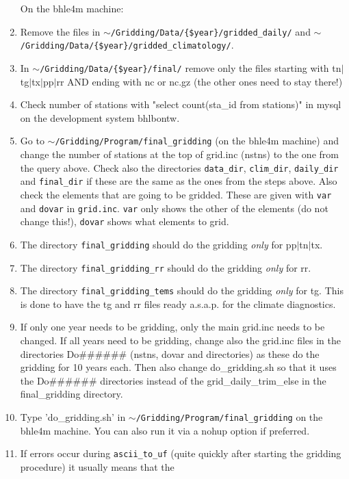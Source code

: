 \documentclass[a4paper]{article}
\begin{document}
\begin{enumerate}
\noindent On the bhle4m machine:
\item Remove the files in
\texttt{$\sim$/Gridding/Data/\{\$year\}/gridded\_daily/}
and \linebreak
\texttt{$\sim$/Gridding/Data/\{\$year\}/gridded\_climatology/}.
\item In \texttt{$\sim$/Gridding/Data/\{\$year\}/final/} remove only the
  files starting with tn$|$tg$|$tx$|$pp$|$rr AND ending with nc or
  nc.gz (the other ones need to stay there!)
\item Check number of stations with "select count(sta\_id from
  stations)" in mysql on the development system bhlbontw.
\item Go to \texttt{$\sim$/Gridding/Program/final\_gridding} (on the
  bhle4m machine) and change the number of stations at the top of
  grid.inc (nstns) to the one from the query above. Check also the
  directories \texttt{data\_dir}, \texttt{clim\_dir},
  \texttt{daily\_dir} and \texttt{final\_dir} if these are the same as
  the ones from the steps above. Also check the elements that are
  going to be gridded. These are given with \texttt{var} and
  \texttt{dovar} in \texttt{grid.inc}. \texttt{var} only shows the
  other of the elements (do not change this!), \texttt{dovar} shows
  what elements to grid.
\item The directory \texttt{final\_gridding} should do the gridding
  \textit{only} for pp$|$tn$|$tx.
\item The directory \texttt{final\_gridding\_rr} should do the gridding
  \textit{only} for rr.
\item The directory \texttt{final\_gridding\_tems} should do the
  gridding \textit{only} for tg. This is done to have the tg and rr
  files ready a.s.a.p. for the climate diagnostics.
\item If only one year needs to be gridding, only the main grid.inc
  needs to be changed. If all years need to be gridding, change also
  the grid.inc files in the directories Do\#\#\#\#\#\# (nstns, dovar
  and directories) as these do the gridding for 10 years each. Then
  also change do\_gridding.sh so that it uses the Do\#\#\#\#\#\#
  directories instead of the grid\_daily\_trim\_else in the
  final\_gridding directory.
\item Type 'do\_gridding.sh' in
  \texttt{$\sim$/Gridding/Program/final\_gridding} on the bhle4m
  machine. You can also run it via a nohup option if preferred.
\item If errors occur during \texttt{ascii\_to\_uf} (quite quickly
  after starting the gridding procedure) it usually means that the

\end{enumerate}
\end{document}
